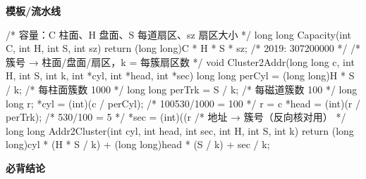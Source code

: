 \documentclass[10pt,a4paper]{ctexart}
\begin{document}
\textbf{模板/流水线}

\begin{codebox}
/* 容量：C 柱面、H 盘面、S 每道扇区、sz 扇区大小 */
long long Capacity(int C, int H, int S, int sz) {
    return (long long)C * H * S * sz;              /* 2019: 307200000 */
}
/* 簇号 → 柱面/盘面/扇区，k = 每簇扇区数 */
void Cluster2Addr(long long c, int H, int S, int k,
                  int *cyl, int *head, int *sec) {
    long long perCyl = (long long)H * S / k;       /* 每柱面簇数 1000 */
    long long perTrk = S / k;                      /* 每磁道簇数 100 */
    long long r;
    *cyl  = (int)(c / perCyl);                     /* 100530/1000 = 100 */
    r     = c %
    *head = (int)(r / perTrk);                     /* 530/100 = 5 */
    *sec  = (int)((r %
}
/* 地址 → 簇号（反向核对用） */
long long Addr2Cluster(int cyl, int head, int sec, int H, int S, int k) {
    return (long long)cyl * (H * S / k) + (long long)head * (S / k) + sec / k;
}
\end{codebox}




\textbf{必背结论}
\end{document}
